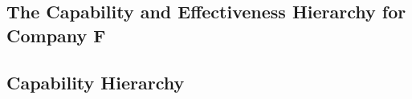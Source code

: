 \begin{appendices}

\chapter{The Capability and Effectiveness Hierarchy for Company F}

\section{Capability Hierarchy} \label{sec:capability_hierarchy}

\newcommand*\addition{\item[\FiveStar]}
\newcommand*\removed{\item[\XSolidBrush]}


\end{appendices}
